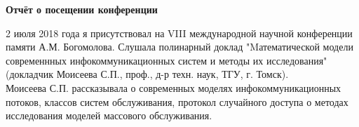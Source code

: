 \documentclass{article}
\begin{document}
\pagestyle{empty}
\begin{center}
\textbf{Отчёт о посещении конференции}
\end{center}
2 июля 2018 года я присутствовал на VIII международной научной конференции памяти
А.М. Богомолова. Слушала полинарный доклад "Mатематической модели современнных
инфокоммуникационных систем и методы их исследования" (докладчик Моисеева С.П.,
проф., д-р техн. наук, ТГУ, г. Томск).\\
Моисеева С.П. рассказывала о современных моделях инфокоммуникационных потоков,
классов систем обслуживания, протокол случайного доступа о методах исследования 
моделей массового обслуживания.
\end{document}

